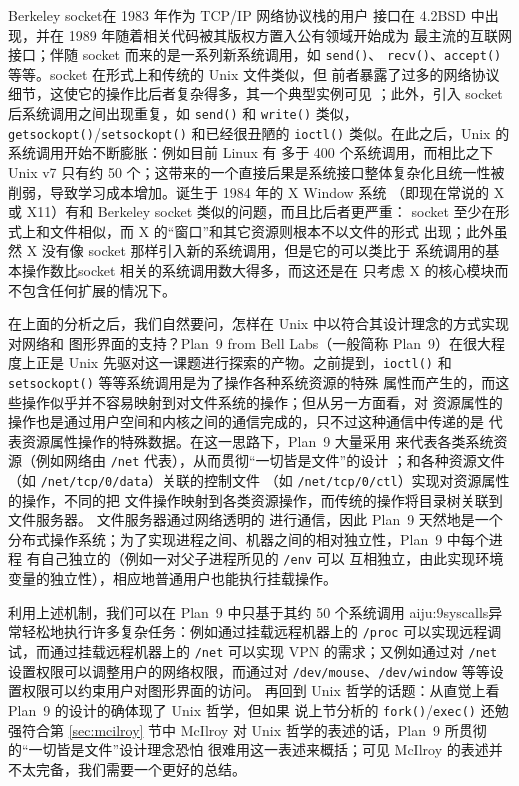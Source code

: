 Berkeley socket在 1983 年作为 TCP/IP 网络协议栈的用户
接口在 4.2BSD 中出现，并在 1989 年随着相关代码被其版权方置入公有领域开始成为
最主流的互联网接口；伴随 socket 而来的是一系列新系统调用，如 \verb|send()|、%
\verb|recv()|、\verb|accept()| 等等。socket 在形式上和传统的 Unix 文件类似，但
前者暴露了过多的网络协议细节，这使它的操作比后者复杂得多，其一个典型实例可见
\parencite{pike2001}；此外，引入 socket 后系统调用之间出现重复，如 \verb|send()|
和 \verb|write()| 类似，\verb|getsockopt()|/\verb|setsockopt()| 和已经很丑陋的
\verb|ioctl()| 类似。在此之后，Unix 的系统调用开始不断膨胀：例如目前 Linux 有
多于 400 个系统调用，而相比之下 Unix v7 只有约 50
个；这带来的一个直接后果是系统接口整体复杂化且统一性被
削弱，导致学习成本增加。诞生于 1984 年的 X Window 系统%
（即现在常说的 X 或 X11）有和 Berkeley socket 类似的问题，而且比后者更严重：%
socket 至少在形式上和文件相似，而 X 的“窗口”和其它资源则根本不以文件的形式
出现；此外虽然 X 没有像 socket 那样引入新的系统调用，但是它的可以类比于
系统调用的基本操作数比socket 相关的系统调用数大得多，而这还是在
只考虑 X 的核心模块而不包含任何扩展的情况下。

在上面的分析之后，我们自然要问，怎样在 Unix 中以符合其设计理念的方式实现对网络和
图形界面的支持？Plan~9 from Bell Labs（一般简称 Plan~9）在很大程度上正是 Unix
先驱对这一课题进行探索的产物。之前提到，\verb|ioctl()|
和 \verb|setsockopt()| 等等系统调用是为了操作各种系统资源的特殊
属性而产生的，而这些操作似乎并不容易映射到对文件系统的操作；但从另一方面看，对
资源属性的操作也是通过用户空间和内核之间的通信完成的，只不过这种通信中传递的是
代表资源属性操作的特殊数据。在这一思路下，Plan~9 大量采用%
来代表各类系统资源（例如网络由 \verb|/net| 代表），从而贯彻“一切皆是文件”的设计%
；和各种资源文件（如 \verb|/net/tcp/0/data|）关联的控制文件
（如 \verb|/net/tcp/0/ctl|）实现对资源属性的操作，不同的把
文件操作映射到各类资源操作，而传统的操作将目录树关联到文件服务器。
文件服务器通过网络透明的 进行通信，因此 Plan~9 天然地是一个
分布式操作系统；为了实现进程之间、机器之间的相对独立性，Plan~9 中每个进程
有自己独立的（例如一对父子进程所见的 \verb|/env| 可以
互相独立，由此实现环境变量的独立性），相应地普通用户也能执行挂载操作。

利用上述机制，我们可以在 Plan~9 中只基于其约 50 个系统调用\cupercite%
{aiju:9syscalls}异常轻松地执行许多复杂任务：例如通过挂载远程机器上的
\verb|/proc| 可以实现远程调试，而通过挂载远程机器上的 \verb|/net| 可以实现
VPN 的需求；又例如通过对 \verb|/net| 设置权限可以调整用户的网络权限，而通过对
\verb|/dev/mouse|、\verb|/dev/window| 等等设置权限可以约束用户对图形界面的访问。
再回到 Unix 哲学的话题：从直觉上看 Plan~9 的设计的确体现了 Unix 哲学，但如果
说上节分析的 \verb|fork()|/\verb|exec()| 还勉强符合第 \ref{sec:mcilroy} 节中
McIlroy 对 Unix 哲学的表述的话，Plan~9 所贯彻的“一切皆是文件”设计理念恐怕
很难用这一表述来概括；可见 McIlroy 的表述并不太完备，我们需要一个更好的总结。

